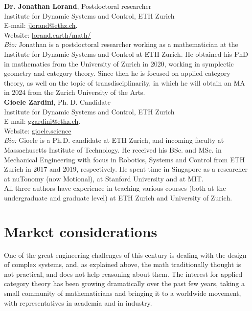 \documentclass[10pt, article, one side]{memoir}
\begin{document}
    \noindent \textbf{Dr.
        Jonathan Lorand}, Postdoctoral researcher\\
    Institute for Dynamic Systems and Control, ETH Zurich\\
    E-mail: \href{mailto:jlorand@ethz.ch}{jlorand@ethz.ch}.
    \\
    Website: \href{http://lorand.earth/math/}{lorand.earth/math/}\\
    \emph{Bio:}
    Jonathan is a postdoctoral researcher working as a mathematician at the Institute for Dynamic Systems and Control at ETH Zurich.
    He obtained his PhD in mathematics from the University of Zurich in 2020, working in symplectic geometry and category theory.
    Since then he is focused on applied category theory, as well on the topic of transdisciplinarity, in which he will obtain an MA in 2024 from the Zurich University of the Arts.
    \\

    \noindent \textbf{Gioele Zardini}, Ph.
    D.
    Candidate\\
    Institute for Dynamic Systems and Control, ETH Zurich\\
    E-mail: \href{mailto:gzardini@ethz.ch}{gzardini@ethz.ch}.
    \\
    Website: \href{https://gioele.science}{gioele.science}\\
    \emph{Bio:}
    Gioele is a Ph.D.
    candidate at ETH Zurich, and incoming faculty at Massachusetts Institute of Technology.
    He received his BSc.
    and MSc. in Mechanical Engineering with focus in Robotics, Systems and Control from ETH Zurich in 2017 and 2019, respectively.
    He spent time in Singapore as a researcher at nuTonomy (now Motional), at Stanford University and at MIT.
    \\

    All three authors have experience in teaching various courses (both at the undergraduate and graduate level) at ETH Zurich and University of Zurich.

    \section{Market considerations}
    One of the great engineering challenges of this century is dealing with the design of complex systems, and, as explained above, the math traditionally thought is not practical, and does not help reasoning about them.
    The interest for applied category theory has been growing dramatically over the past few years, taking a small community of mathematicians and bringing it to a worldwide movement, with representatives in academia and in industry.
\end{document}
